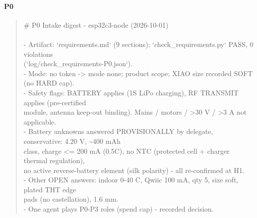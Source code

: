 \documentclass[11pt]{article}
\begin{document}
\paragraph*{P0}
\begin{quote}\small\ttfamily\raggedright
\# P0 Intake digest - esp32c3-node (2026-10-01)\\
~\\
- Artifact: `requirements.md` (9 sections); `check\_requirements.py` PASS, 0 violations\\
  (`log/check\_requirements-P0.json`).\\
- Mode: no token -\textgreater{} mode none; product scope; XIAO size recorded SOFT (no HARD cap).\\
- Safety flags: BATTERY applies (1S LiPo charging), RF TRANSMIT applies (pre-certified\\
  module, antenna keep-out binding). Mains / motors / \textgreater{}30 V / \textgreater{}3 A not applicable.\\
- Battery unknowns answered PROVISIONALLY by delegate, conservative: 4.20 V, \textasciitilde{}400 mAh\\
  class, charge \textless{}= 200 mA (0.5C), no NTC (protected cell + charger thermal regulation),\\
  no active reverse-battery element (silk polarity) - all re-confirmed at H1.\\
- Other OPEN answers: indoor 0-40 C, Qwiic 100 mA, qty 5, size soft, plated THT edge\\
  pads (no castellation), 1.6 mm.\\
- One agent plays P0-P3 roles (spend cap) - recorded decision.
\end{quote}
\end{document}
